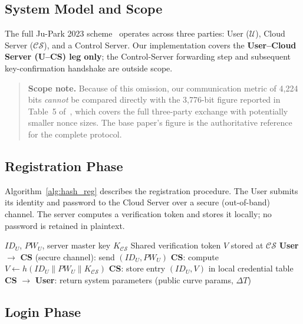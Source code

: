 \documentclass[journal]{IEEEtran}
\newcommand{\ID}{\mathit{ID}}          %
\newcommand{\PW}{\mathit{PW}}          %
\newcommand{\h}[1]{h(#1)}             %
\newcommand{\UC}{\mathcal{U}}          %
\newcommand{\CS}{\mathcal{CS}}         %
\begin{document}
\subsection{System Model and Scope}

The full Ju-Park 2023 scheme~\cite{JuPark2023} operates across three parties:
User ($\UC$), Cloud Server ($\CS$), and a Control Server. Our implementation
covers the \textbf{User--Cloud Server (U--CS) leg only}; the Control-Server
forwarding step and subsequent key-confirmation handshake are outside scope.

\begin{quote}
\textbf{Scope note.} Because of this omission, our communication metric of
4,224 bits \emph{cannot} be compared directly with the 3,776-bit figure
reported in Table~5 of~\cite{JuPark2023}, which covers the full three-party
exchange with potentially smaller nonce sizes. The base paper's figure is the
authoritative reference for the complete protocol.
\end{quote}

\subsection{Registration Phase}

Algorithm~\ref{alg:hash_reg} describes the registration procedure.
The User submits its identity and password to the Cloud Server over a secure
(out-of-band) channel. The server computes a verification token and stores
it locally; no password is retained in plaintext.

\begin{algorithm}[!t]
\caption{Hash+XOR Registration Phase}
\label{alg:hash_reg}
\begin{algorithmic}[1]
\Require $\ID_U$, $\PW_U$, server master key $K_\CS$
\Ensure Shared verification token $V$ stored at $\CS$
\State \textbf{User} $\to$ \textbf{CS} (secure channel): send $(\ID_U, \PW_U)$
\State \textbf{CS}: compute $V \leftarrow \h{\ID_U \| \PW_U \| K_\CS}$
\State \textbf{CS}: store entry $(\ID_U, V)$ in local credential table
\State \textbf{CS} $\to$ \textbf{User}: return system parameters (public curve params, $\Delta T$)
\end{algorithmic}
\end{algorithm}

\subsection{Login Phase}
\end{document}
